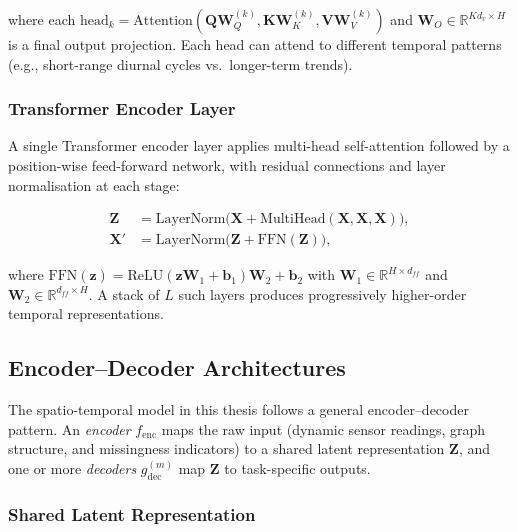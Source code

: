 \noindent where each $\text{head}_k = \text{Attention}(\mathbf{Q}\mathbf{W}_Q^{(k)}, \mathbf{K}\mathbf{W}_K^{(k)}, \mathbf{V}\mathbf{W}_V^{(k)})$ and $\mathbf{W}_O \in \mathbb{R}^{Kd_v \times H}$ is a final output projection. Each head can attend to different temporal patterns (e.g., short-range diurnal cycles vs.\ longer-term trends).

\subsubsection{Transformer Encoder Layer}

A single Transformer encoder layer applies multi-head self-attention followed by a position-wise feed-forward network, with residual connections and layer normalisation at each stage:

\begin{align}
    \mathbf{Z} &= \text{LayerNorm}\bigl(\mathbf{X} + \text{MultiHead}(\mathbf{X}, \mathbf{X}, \mathbf{X})\bigr), \label{eq:transformer-attn} \\
    \mathbf{X}' &= \text{LayerNorm}\bigl(\mathbf{Z} + \text{FFN}(\mathbf{Z})\bigr), \label{eq:transformer-ffn}
\end{align}

\noindent where $\text{FFN}(\mathbf{z}) = \text{ReLU}(\mathbf{z}\mathbf{W}_1 + \mathbf{b}_1)\mathbf{W}_2 + \mathbf{b}_2$ with $\mathbf{W}_1 \in \mathbb{R}^{H \times d_{ff}}$ and $\mathbf{W}_2 \in \mathbb{R}^{d_{ff} \times H}$. A stack of $L$ such layers produces progressively higher-order temporal representations.

\subsection{Encoder--Decoder Architectures}
\label{subsec:meth-encdec}

The spatio-temporal model in this thesis follows a general encoder--decoder pattern. An \emph{encoder} $f_{\text{enc}}$ maps the raw input (dynamic sensor readings, graph structure, and missingness indicators) to a shared latent representation $\mathbf{Z}$, and one or more \emph{decoders} $g_{\text{dec}}^{(m)}$ map $\mathbf{Z}$ to task-specific outputs.

\subsubsection{Shared Latent Representation}

